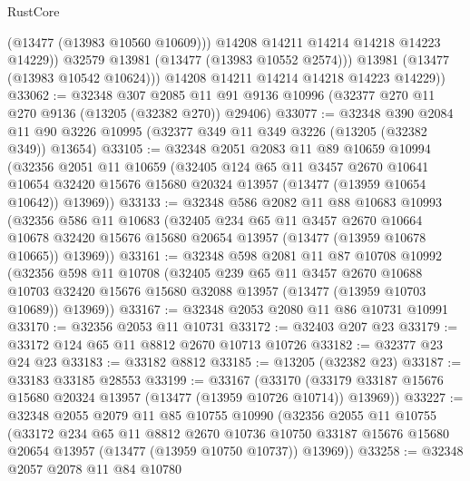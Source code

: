 \begin{lexlean}{RustCore}
\begin{coremodule}
                  (@13477 (@13983 @10560 @10609)))
                @14208
                @14211
                @14214
                @14218
                @14223
                @14229))
            @32579
            @13981
            (@13477 (@13983 @10552 @2574)))
          @13981
          (@13477 (@13983 @10542 @10624)))
        @14208
        @14211
        @14214
        @14218
        @14223
        @14229))
@33062 := @32348
    @307
    @2085
    @11
    @91
    @9136
    @10996
    (@32377 @270 @11 @270 @9136 (@13205 (@32382 @270)) @29406)
@33077 := @32348
    @390
    @2084
    @11
    @90
    @3226
    @10995
    (@32377 @349 @11 @349 @3226 (@13205 (@32382 @349)) @13654)
@33105 := @32348
    @2051
    @2083
    @11
    @89
    @10659
    @10994
    (@32356
      @2051
      @11
      @10659
      (@32405
        @124
        @65
        @11
        @3457
        @2670
        @10641
        @10654
        @32420
        @15676
        @15680
        @20324
        @13957
        (@13477 (@13959 @10654 @10642))
        @13969))
@33133 := @32348
    @586
    @2082
    @11
    @88
    @10683
    @10993
    (@32356
      @586
      @11
      @10683
      (@32405
        @234
        @65
        @11
        @3457
        @2670
        @10664
        @10678
        @32420
        @15676
        @15680
        @20654
        @13957
        (@13477 (@13959 @10678 @10665))
        @13969))
@33161 := @32348
    @598
    @2081
    @11
    @87
    @10708
    @10992
    (@32356
      @598
      @11
      @10708
      (@32405
        @239
        @65
        @11
        @3457
        @2670
        @10688
        @10703
        @32420
        @15676
        @15680
        @32088
        @13957
        (@13477 (@13959 @10703 @10689))
        @13969))
@33167 := @32348 @2053 @2080 @11 @86 @10731 @10991
@33170 := @32356 @2053 @11 @10731
@33172 := @32403 @207 @23
@33179 := @33172 @124 @65 @11 @8812 @2670 @10713 @10726
@33182 := @32377 @23 @24 @23
@33183 := @33182 @8812
@33185 := @13205 (@32382 @23)
@33187 := @33183 @33185 @28553
@33199 := @33167
    (@33170 (@33179 @33187 @15676 @15680 @20324 @13957 (@13477 (@13959 @10726 @10714)) @13969))
@33227 := @32348
    @2055
    @2079
    @11
    @85
    @10755
    @10990
    (@32356
      @2055
      @11
      @10755
      (@33172
        @234
        @65
        @11
        @8812
        @2670
        @10736
        @10750
        @33187
        @15676
        @15680
        @20654
        @13957
        (@13477 (@13959 @10750 @10737))
        @13969))
@33258 := @32348
    @2057
    @2078
    @11
    @84
    @10780

\end{coremodule}
\end{lexlean}
